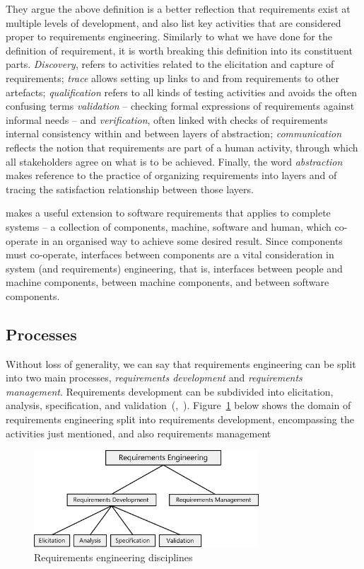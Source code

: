 \documentclass[dissertation,final]{softeng}
\begin{document}
They argue the above definition is a better reflection that requirements exist at multiple levels of development, and also list key activities that are considered proper to requirements engineering. Similarly to what we have done for the definition of requirement, it is worth breaking this definition into its constituent parts. \emph{Discovery}, refers to activities related to the elicitation and capture of requirements; \emph{trace} allows setting up links to and from requirements to other artefacts; \emph{qualification} refers to all kinds of testing activities and avoids the often confusing terms \emph{validation} -- checking formal expressions of requirements against informal needs -- and \emph{verification}, often linked with checks of requirements internal consistency within and between layers of abstraction; \emph{communication} reflects the notion that requirements are part of a human activity, through which all stakeholders agree on what is to be achieved. Finally, the word \emph{abstraction} makes reference to the practice of organizing requirements into layers and of tracing the satisfaction relationship between those layers.

\citet{Hull2011} makes a useful extension to software requirements that applies to complete systems -- a collection of components, machine, software and human, which co-operate in an organised way to achieve some desired result. Since components must co-operate, interfaces between components are a vital consideration in system (and requirements) engineering, that is, interfaces between people and machine components, between machine components, and between software components.

\subsection{Processes}
Without loss of generality, we can say that requirements engineering can be split into two main processes, \emph{requirements development} and \emph{requirements management}. Requirements development can be subdivided into elicitation, analysis, specification, and validation~(,~\citeyear{SWEBOK}). Figure~\ref{fig:requirements_engineering_disciplines} below shows the domain of requirements engineering split into requirements development, encompassing the activities just mentioned, and also requirements management

\begin{figure}[h]
\includegraphics[width=0.75\textwidth]{RequirementsEngineeringDisciplines}
\centering
\caption[Requirements engineering disciplines]{Requirements engineering disciplines~\citep[p. 15]{Wiegers2013}}
\label{fig:requirements_engineering_disciplines}
\end{figure}
\end{document}
